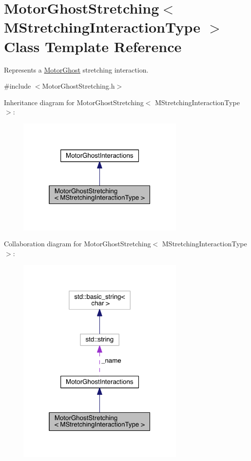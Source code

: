\hypertarget{classMotorGhostStretching}{\section{Motor\+Ghost\+Stretching$<$ M\+Stretching\+Interaction\+Type $>$ Class Template Reference}
\label{classMotorGhostStretching}
}


Represents a \hyperlink{classMotorGhost}{Motor\+Ghost} stretching interaction.  




{\ttfamily \#include $<$Motor\+Ghost\+Stretching.\+h$>$}



Inheritance diagram for Motor\+Ghost\+Stretching$<$ M\+Stretching\+Interaction\+Type $>$\+:\nopagebreak
\begin{figure}[H]
\begin{center}
\leavevmode
\includegraphics[width=235pt]{classMotorGhostStretching__inherit__graph}
\end{center}
\end{figure}


Collaboration diagram for Motor\+Ghost\+Stretching$<$ M\+Stretching\+Interaction\+Type $>$\+:\nopagebreak
\begin{figure}[H]
\begin{center}
\leavevmode
\includegraphics[width=235pt]{classMotorGhostStretching__coll__graph}
\end{center}
\end{figure}
